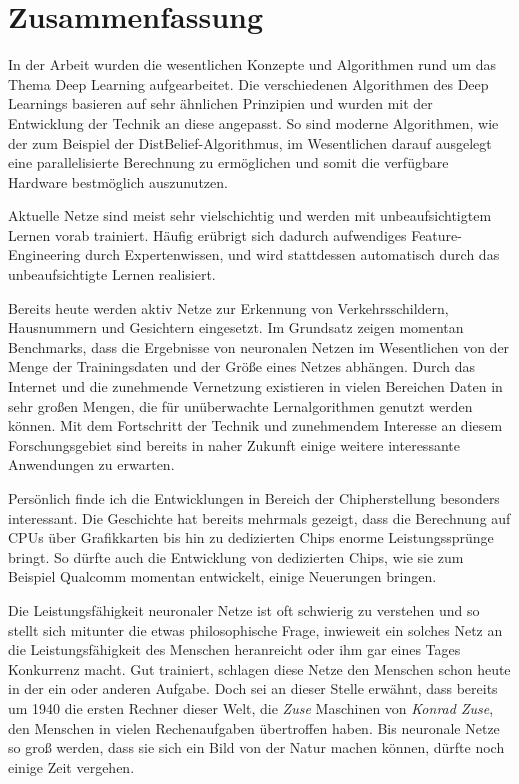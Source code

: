 \chapter{Zusammenfassung}

In der Arbeit wurden die wesentlichen Konzepte und Algorithmen rund um das Thema Deep Learning aufgearbeitet. Die verschiedenen Algorithmen des Deep Learnings basieren auf sehr ähnlichen Prinzipien und wurden mit der Entwicklung der Technik an diese angepasst. So sind moderne Algorithmen, wie der zum Beispiel der DistBelief-Algorithmus, im Wesentlichen darauf ausgelegt eine parallelisierte Berechnung zu ermöglichen und somit die verfügbare Hardware bestmöglich auszunutzen.

Aktuelle Netze sind meist sehr vielschichtig und werden mit unbeaufsichtigtem Lernen vorab trainiert. Häufig erübrigt sich dadurch aufwendiges Feature-Engineering durch Expertenwissen, und wird stattdessen automatisch durch das unbeaufsichtigte Lernen realisiert.

Bereits heute werden aktiv Netze zur Erkennung von Verkehrsschildern, Hausnummern und Gesichtern eingesetzt. Im Grundsatz zeigen momentan Benchmarks, dass die Ergebnisse von neuronalen Netzen im Wesentlichen von der Menge der Trainingsdaten und der Größe eines Netzes abhängen. Durch das Internet und die zunehmende Vernetzung existieren in vielen Bereichen Daten in sehr großen Mengen, die für unüberwachte Lernalgorithmen genutzt werden können. Mit dem Fortschritt der Technik und zunehmendem Interesse an diesem Forschungsgebiet sind bereits in naher Zukunft einige weitere interessante Anwendungen zu erwarten.

Persönlich finde ich die Entwicklungen in Bereich der Chipherstellung besonders interessant. Die Geschichte hat bereits mehrmals gezeigt, dass die Berechnung auf CPUs über Grafikkarten bis hin zu dedizierten Chips enorme Leistungssprünge bringt. So dürfte auch die Entwicklung von dedizierten Chips, wie sie zum Beispiel Qualcomm momentan entwickelt, einige Neuerungen bringen.

Die Leistungsfähigkeit neuronaler Netze ist oft schwierig zu verstehen und so stellt sich mitunter die etwas philosophische Frage, inwieweit ein solches Netz an die Leistungsfähigkeit des Menschen heranreicht oder ihm gar eines Tages Konkurrenz macht. Gut trainiert, schlagen diese Netze den Menschen schon heute in der ein oder anderen Aufgabe. Doch sei an dieser Stelle erwähnt, dass bereits um 1940 die ersten Rechner dieser Welt, die \emph{Zuse} Maschinen von \emph{Konrad Zuse}, den Menschen in vielen Rechenaufgaben übertroffen haben. Bis neuronale Netze so groß werden, dass sie sich ein Bild von der Natur machen können, dürfte noch einige Zeit vergehen.